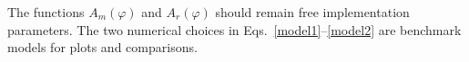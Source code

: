 \documentclass[11pt,a4paper,english,twoside]{article}
\begin{document}
The functions $A_m(\varphi)$ and $A_r(\varphi)$ should remain free implementation
parameters. The two numerical choices in Eqs.~\eqref{model1}--\eqref{model2} are benchmark
models for plots and comparisons.


$$$$



\end{document}
